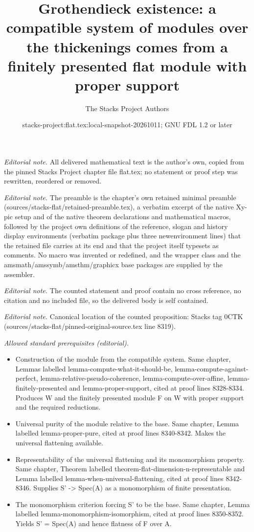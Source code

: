 \documentclass[10pt,a4paper]{amsart}
\title{Grothendieck existence: a compatible system of modules over the thickenings comes from a finitely presented flat module with proper support}
\author{The Stacks Project Authors}
\date{stacks-project:flat.tex:local-snapshot-20261011; GNU FDL 1.2 or later}
\theoremstyle{plain}
\theoremstyle{definition}
\theoremstyle{remark}
\numberwithin{equation}{subsection}
\begin{document}
\maketitle
\noindent\textit{Editorial note.} All delivered mathematical text is the author's own, copied from the pinned Stacks Project chapter file flat.tex; no statement or proof step was rewritten, reordered or removed.\par\medskip
\noindent\textit{Editorial note.} The preamble is the chapter's own retained minimal preamble (sources/stacks-flat/retained-preamble.tex), a verbatim excerpt of the native Xy-pic setup and of the native theorem declarations and mathematical macros, followed by the project own definitions of the reference, slogan and history display environments (verbatim package plus three newenvironment lines) that the retained file carries at its end and that the project itself typesets as comments. No macro was invented or redefined, and the wrapper class and the amsmath/amssymb/amsthm/graphicx base packages are supplied by the assembler.\par\medskip
\noindent\textit{Editorial note.} The counted statement and proof contain no cross reference, no citation and no included file, so the delivered body is self contained.\par\medskip
\noindent\textit{Editorial note.} Canonical location of the counted proposition: Stacks tag 0CTK (sources/stacks-flat/pinned-original-source.tex line 8319).\par\medskip
\noindent\textit{Allowed standard prerequisites (editorial).}\begin{itemize}
\item Construction of the module from the compatible system. Same chapter, Lemmas labelled lemma-compute-what-it-should-be, lemma-compute-against-perfect, lemma-relative-pseudo-coherence, lemma-compute-over-affine, lemma-finitely-presented and lemma-proper-support, cited at proof lines 8328-8334. Produces W and the finitely presented module F on W with proper support and the required reductions.
\item Universal purity of the module relative to the base. Same chapter, Lemma labelled lemma-proper-pure, cited at proof lines 8340-8342. Makes the universal flattening available.
\item Representability of the universal flattening and its monomorphism property. Same chapter, Theorem labelled theorem-flat-dimension-n-representable and Lemma labelled lemma-when-universal-flattening, cited at proof lines 8342-8346. Supplies S' -> Spec(A) as a monomorphism of finite presentation.
\item The monomorphism criterion forcing S' to be the base. Same chapter, Lemma labelled lemma-monomorphism-isomorphism, cited at proof lines 8350-8352. Yields S' = Spec(A) and hence flatness of F over A.
\end{itemize}\medskip
\end{document}

